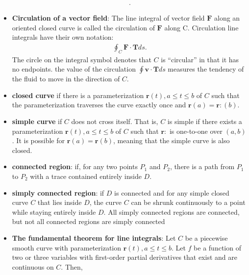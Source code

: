 \documentclass{report}
\begin{document}
\begin{itemize}
\begin{align*}
            .\end{align*}
        \item \textbf{Circulation of a vector field}:
            The line integral of vector field $\mathbf{F}$ along an oriented closed curve is called the circulation of $\mathbf{F}$ along C. Circulation line integrals have their own notation:
            \begin{align*}
                \oint_C \mathbf{F} \cdot \mathbf{T}ds
            .\end{align*}
            \bigbreak \noindent 
             The circle on the integral symbol denotes that $C$ is “circular” in that it has no endpoints.
             \bigbreak \noindent 
             the value of the circulation  $\oint \mathbf{v} \cdot \mathbf{T}ds$ measures the tendency of the fluid to move in the direction of $C$.
         \item \textbf{closed curve} if there is a parameterization \(\mathbf{r}(t), a \leq t \leq b\) of \( C \) such that the parameterization traverses the curve exactly once and \(\mathbf{r}(a) = \mathbf{r}:(b)\).
         \item \textbf{simple curve} if \( C \) does not cross itself. That is, \( C \) is simple if there exists a parameterization \(\mathbf{r}(t), a \leq t \leq b\) of \( C \) such that \(\mathbf{r}:\) is one-to-one over \((a, b)\).
             \bigbreak \noindent 
             It is possible for \(\mathbf{r}(a) = \mathbf{r}(b)\), meaning that the simple curve is also closed.
             \bigbreak \noindent 
        \item \textbf{connected region}: if, for any two points \( P_1 \) and \( P_2 \), there is a path from \( P_1 \) to \( P_2 \) with a trace contained entirely inside \( D \). 
        \item \textbf{simply connected region}: if \( D \) is connected and for any simple closed curve \( C \) that lies inside \( D \), the curve \( C \) can be shrunk continuously to a point while staying entirely inside \( D \). 
            \bigbreak \noindent 
            All simply connected regions are connected, but not all connected regions are simply connected
            \bigbreak \noindent 
        \item \textbf{The fundamental theorem for line integrals}:
            Let \( C \) be a piecewise smooth curve with parameterization \(\mathbf{r}(t), a \leq t \leq b\).
            \bigbreak \noindent 
            Let \( f \) be a function of two or three variables with first-order partial derivatives that exist and are continuous on \( C \). Then,

\end{itemize}
\end{document}
